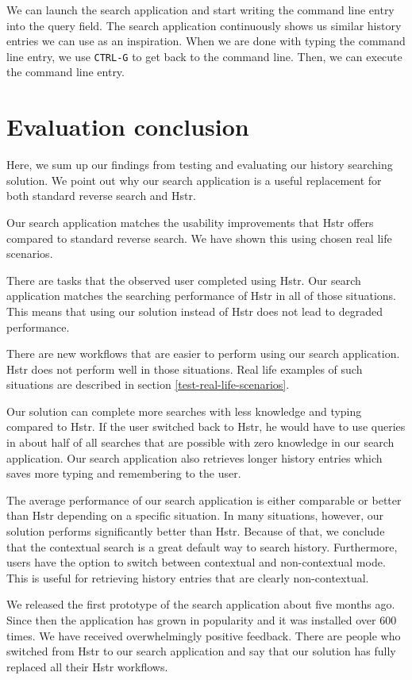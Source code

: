 
We can launch the search application and start writing the command line entry into the query field. The search application continuously shows us similar history entries we can use as an inspiration. When we are done with typing the command line entry, we use \verb|CTRL-G| to get back to the command line. Then, we can execute the command line entry.


\section{Evaluation conclusion}


Here, we sum up our findings from testing and evaluating our history searching solution. We point out why our search application is a useful replacement for both standard reverse search and Hstr. 

Our search application matches the usability improvements that Hstr offers compared to standard reverse search. We have shown this using chosen real life scenarios.

There are tasks that the observed user completed using Hstr. Our search application matches the searching performance of Hstr in all of those situations. This means that using our solution instead of Hstr does not lead to degraded performance.

There are new workflows that are easier to perform using our search application. Hstr does not perform well in those situations. Real life examples of such situations are described in section \ref{test-real-life-scenarios}.

Our solution can complete more searches with less knowledge and typing compared to Hstr. If the user switched back to Hstr, he would have to use queries in about half of all searches that are possible with zero knowledge in our search application. Our search application also retrieves longer history entries which saves more typing and remembering to the user.

The average performance of our search application is either comparable or better than Hstr depending on a specific situation. In many situations, however, our solution performs significantly better than Hstr. Because of that, we conclude that the contextual search is a great default way to search history. Furthermore, users have the option to switch between contextual and non-contextual mode. This is useful for retrieving history entries that are clearly non-contextual.
    
We released the first prototype of the search application about five months ago. Since then the application has grown in popularity and it was installed over 600 times. We have received overwhelmingly positive feedback. There are people who switched from Hstr to our search application and say that our solution has fully replaced all their Hstr workflows.



